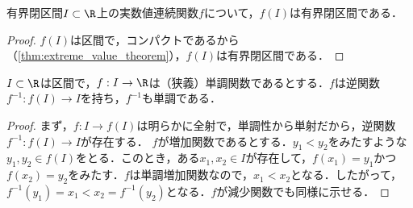 \documentclass[a4paper,10pt]{ltjsarticle}
\begin{document}
\begin{MyCorollary}
  有界閉区間\(I \subset \R\)上の実数値連続関数\(f\)について，\(f(I)\)は有界閉区間である．
\end{MyCorollary}
\begin{proof}
  \(f(I)\)は区間で，コンパクトであるから（\cref{thm:extreme_value_theorem}），\(f(I)\)は有界閉区間である．
\end{proof}


\begin{MyLemma}
  \(I \subset \R\)は区間で，\(f : I \to \R\)は（狭義）単調関数であるとする．\(f\)は逆関数\(f^{-1} : f(I) \to I\)を持ち，\(f^{-1}\)も単調である．
\end{MyLemma}
\begin{proof}
  まず，\(f: I \to f(I)\)は明らかに全射で，単調性から単射だから，逆関数\(f^{-1} : f(I) \to I\)が存在する．
  \(f\)が増加関数であるとする．\(y_1 < y_2\)をみたすような\(y_1, y_2 \in f(I)\)をとる．このとき，ある\(x_1, x_2 \in I\)が存在して，\(f(x_1) = y_1\)かつ\(f(x_2) = y_2\)をみたす．\(f\)は単調増加関数なので，\(x_1 < x_2\)となる．したがって，\(f^{-1}(y_1) = x_1 < x_2 = f^{-1}(y_2)\)となる．\(f\)が減少関数でも同様に示せる．
\end{proof}
\end{document}
